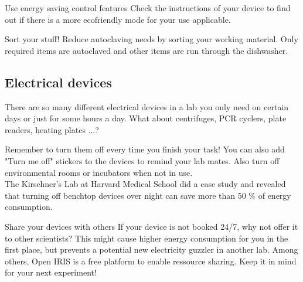 \begin{suggest}{Use energy saving control features }
	Check the instructions of your device to find out if there is a more ecofriendly mode for your use applicable.
	
\end{suggest}	

\begin{suggest}{Sort your stuff! }
	Reduce autoclaving needs by sorting your working material. Only required items are autoclaved and other items are run through the dishwasher.
\end{suggest}	


\subsection{Electrical devices}
	There are so many different electrical devices in a lab you only need on certain days or just for some hours a day. 
	What about centrifuges, PCR cyclers, plate readers, heating plates ...? 
	
	
\begin{suggest}{Remember to turn them off every time you finish your task!} 
	You can also add "Turn me off" stickers to the devices to remind your lab mates. 
	Also turn off environmental rooms or incubators when not in use.\\ 
	The Kirschner's Lab at Harvard Medical School did a case study and revealed that turning off benchtop devices over night can save more than 50 \% of energy consumption. \cite{Kirschner_1} \cite{Kirschner_2}
\end{suggest}	

\begin{suggest}{Share your devices with others}
	If your device is not booked 24/7, why not offer it to other scientists? This might cause higher energy consumption for you in the first place, but prevents a potential new electricity guzzler in another lab. Among others, Open IRIS is a free platform to enable ressource sharing. Keep it in mind for your next experiment! \cite{IRIS}
\end{suggest}


